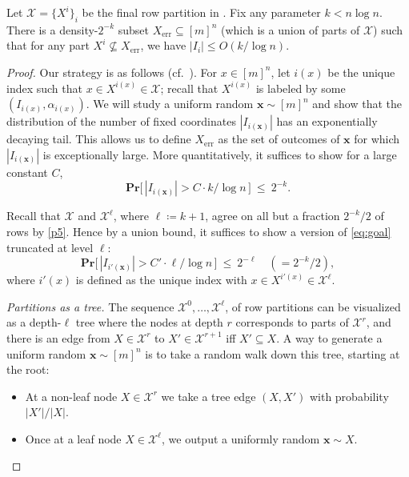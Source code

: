 \documentclass{toc}
\renewcommand{\Pr}{\mathbf{Pr}}
\DeclareMathOperator{\err}{err}
\newcommand{\x}{\bm{x}}
\newcommand{\calX}{\mathcal{X}}
\begin{document}
\begin{lemma} \label{lem:tri-row-error-bound}
Let $\calX =\{X^i\}_i$ be the final row partition in . Fix any parameter $k<n\log n$. There is a density-$2^{-k}$ subset $X_{\err} \subseteq [m]^n$ (which is a union of parts of $\calX$) such that for any part $X^i\not\subseteq X_{\err}$, we have $|I_i|\leq O(k/\log n)$.
\end{lemma}
\begin{proof}
Our strategy is as follows (cf.~\cite[Lemma 7]{goos17bpp}). For $x\in[m]^n$, let $i(x)$ be the unique index such that $x\in X^{i(x)}\in\calX$; recall that $X^{i(x)}$ is labeled by some $(I_{i(x)},\alpha_{i(x)})$. We will study a uniform random $\x\sim[m]^n$ and show that the distribution of the number of fixed coordinates $|I_{i(\x)}|$ has an exponentially decaying tail. This allows us to define $X_{\err}$ as the set of outcomes of $\x$ for which $|I_{i(\x)}|$ is exceptionally large. More quantitatively, it suffices to show for a large constant $C$,
\begin{equation}\label{eq:goal}
\Pr\big[\, |I_{i(\x)}| > C\cdot k/\log n\,\big]~\leq~2^{-k}.
\end{equation}

Recall that $\calX$ and $\calX^{\ell}$, where $\ell\coloneqq k+1$, agree on all but a fraction $2^{-k}/2$ of rows by \ref{p5}. Hence by a union bound, it suffices to show a version of \eqref{eq:goal} truncated at level $\ell$:
\begin{equation}\label{eq:goal2}
\Pr\big[\, |I_{i'(\x)}| > C'\cdot \ell/\log n\,\big]~\leq~2^{-\ell}\quad(= 2^{-k}/2),
\end{equation}
where $i'(x)$ is defined as the unique index with $x\in X^{i'(x)}\in \calX^{\ell}$.


\emph{Partitions as a tree.}
The sequence $\calX^0,\ldots,\calX^\ell$, of row partitions can be visualized as a depth-$\ell$ tree where the nodes at depth $r$ corresponds to parts of $\calX^r$, and there is an edge from $X\in\calX^r$ to $X'\in\calX^{r+1}$ iff $X'\subseteq X$. A way to generate a uniform random $\x\sim[m]^n$ is to take a random walk down this tree, starting at the root:
\begin{itemize}
\item At a non-leaf node $X\in\calX^r$ we take a tree edge $(X,X')$ with probability $|X'|/|X|$.
\item Once at a leaf node $X\in\calX^\ell$, we output a uniformly %
random $\x\sim X$.
\end{itemize}


\end{proof}
\end{document}
